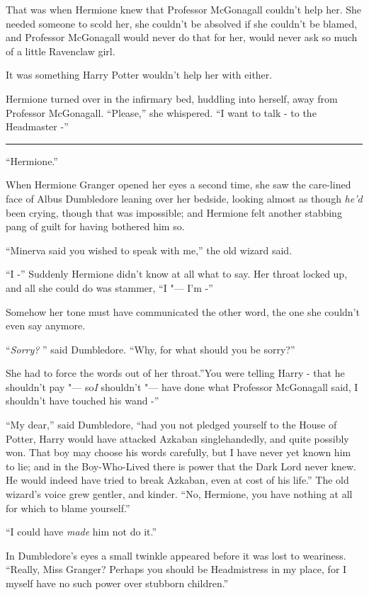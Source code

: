 That was when Hermione knew that Professor McGonagall couldn't help her.
She needed someone to scold her, she couldn't be absolved if she
couldn't be blamed, and Professor McGonagall would never do that for
her, would never ask so much of a little Ravenclaw girl.

It was something Harry Potter wouldn't help her with either.

Hermione turned over in the infirmary bed, huddling into herself, away
from Professor McGonagall. ``Please,'' she whispered. ``I want to talk -
to the Headmaster -''

\begin{center}\rule{3in}{0.4pt}\end{center}

``Hermione.''

When Hermione Granger opened her eyes a second time, she saw the
care-lined face of Albus Dumbledore leaning over her bedside, looking
almost as though \emph{he'd} been crying, though that was impossible;
and Hermione felt another stabbing pang of guilt for having bothered him
so.

``Minerva said you wished to speak with me,'' the old wizard said.

``I -'' Suddenly Hermione didn't know at all what to say. Her throat
locked up, and all she could do was stammer, ``I "--- I'm -''

Somehow her tone must have communicated the other word, the one she
couldn't even say anymore.

``\emph{Sorry?} '' said Dumbledore. ``Why, for what should you be sorry?''

She had to force the words out of her throat.''You were telling Harry -
that he shouldn't pay "--- so\emph{I} shouldn't "--- have done what Professor
McGonagall said, I shouldn't have touched his wand -''

``My dear,'' said Dumbledore, ``had you not pledged yourself to the
House of Potter, Harry would have attacked Azkaban singlehandedly, and
quite possibly won. That boy may choose his words carefully, but I have
never yet known him to lie; and in the Boy-Who-Lived there is power that
the Dark Lord never knew. He would indeed have tried to break Azkaban,
even at cost of his life.'' The old wizard's voice grew gentler, and
kinder. ``No, Hermione, you have nothing at all for which to blame
yourself.''

``I could have \emph{made} him not do it.''

In Dumbledore's eyes a small twinkle appeared before it was lost to
weariness. ``Really, Miss Granger? Perhaps you should be Headmistress in
my place, for I myself have no such power over stubborn children.''

